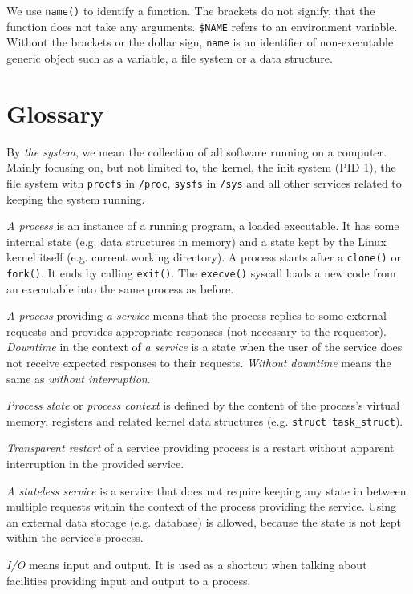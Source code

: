 We use {\tt name()} to identify a function. The brackets do not signify, that the function does not take any arguments. {\tt \$NAME} refers to an environment variable. Without the brackets or the dollar sign, {\tt name} is an identifier of non-executable generic object such as a variable, a file system or a data structure.

\section{Glossary}

By \emph{the system}, we mean the collection of all software running on a computer. Mainly focusing on, but not limited to, the kernel, the init system (PID 1), the file system with {\tt procfs} in {\tt /proc}, {\tt sysfs} in {\tt /sys} and all other services related to keeping the system running.

\emph{A process} is an instance of a running program, a loaded executable. It has some internal state (e.g. data structures in memory) and a state kept by the Linux kernel itself (e.g. current working directory). A process starts after a {\tt clone()} or {\tt fork()}. It ends by calling {\tt exit()}. The {\tt execve()} syscall loads a new code from an executable into the same process as before.

\emph{A process} providing \emph{a service} means that the process replies to some external requests and provides appropriate responses (not necessary to the requestor). \emph{Downtime} in the context of \emph{a service} is a state when the user of the service does not receive expected responses to their requests. \emph{Without downtime} means the same as \emph{without interruption}.

\emph{Process state} or \emph{process context} is defined by the content of the process's virtual memory, registers and related kernel data structures (e.g. {\tt struct task\_struct}).

\emph{Transparent restart} of a service providing process is a restart without apparent interruption in the provided service.

\emph{A stateless service} is a service that does not require keeping any state in between multiple requests within the context of the process providing the service. Using an external data storage (e.g. database) is allowed, because the state is not kept within the service's process.

\emph{I/O} means input and output. It is used as a shortcut when talking about facilities providing input and output to a process.

